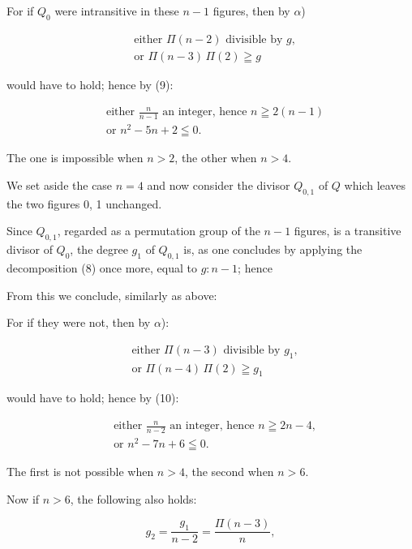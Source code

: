 For if $Q_0$ were intransitive in these $n-1$ figures, then by $\alpha$)

\[
\begin{aligned}
&\text{either } \Pi(n-2) \text{ divisible by } g,\\
&\text{or } \Pi(n-3)\,\Pi(2) \geqq g
\end{aligned}
\]

would have to hold; hence by (9):

\[
\begin{aligned}
&\text{either } \frac{n}{n-1} \text{ an integer, hence } n \geqq 2(n-1)\\
&\text{or } n^2 - 5n + 2 \leqq 0.
\end{aligned}
\]

The one is impossible when $n > 2$, the other when $n > 4$.

We set aside the case $n = 4$ and now consider the divisor $Q_{0,1}$ of
$Q$ which leaves the two figures 0, 1 unchanged.

Since $Q_{0,1}$, regarded as a permutation group of the $n-1$ figures, is a
transitive divisor of $Q_0$, the degree $g_1$ of $Q_{0,1}$ is, as one concludes
by applying the decomposition (8) once more, equal to $g : n-1$; hence


From this we conclude, similarly as above:


For if they were not, then by $\alpha$):

\[
\begin{aligned}
&\text{either } \Pi(n-3) \text{ divisible by } g_1,\\
&\text{or } \Pi(n-4)\,\Pi(2) \geqq g_1
\end{aligned}
\]

would have to hold; hence by (10):

\[
\begin{aligned}
&\text{either } \frac{n}{n-2} \text{ an integer, hence } n \geqq 2n - 4,\\
&\text{or } n^2 - 7n + 6 \leqq 0.
\end{aligned}
\]

The first is not possible when $n > 4$, the second when $n > 6$.

Now if $n > 6$, the following also holds:


\[ g_2 = \frac{g_1}{n-2} = \frac{\Pi(n-3)}{n}, \]

